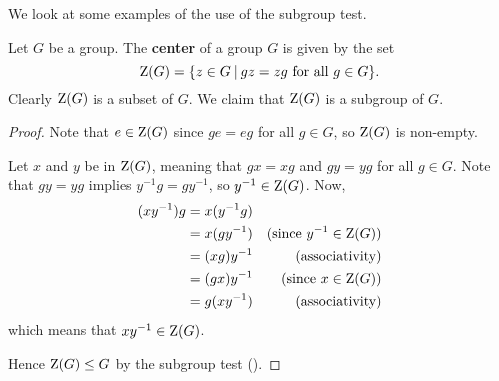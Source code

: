 We look at some examples of the use of the subgroup test.
\begin{example}\label{example-center-of-group}
    Let $G$ be a group. The \textbf{center} of a group $G$ is given by the set
    \[
        \CenterGrp{G} = \{z \in G \vert gz = zg \text{ for all } g \in G\}.
    \]
    Clearly $\mathrm{Z}(G)$ is a subset of $G$. We claim that $\mathrm{Z}(G)$ is a subgroup of $G$.

    \begin{proof}
	    Note that $e \in \mathrm{Z}(G)$ since $ge = eg$ for all $g \in G$, so $\mathrm{Z}(G)$ is non-empty.

	    Let $x$ and $y$ be in $\mathrm{Z}(G)$, meaning that $gx = xg$ and $gy = yg$ for all $g \in G$. Note that $gy = yg$ implies $y^{-1}g = gy^{-1}$, so $y^{-1} \in \mathrm{Z}(G)$. Now,
	    \begin{align*}
	        (xy^{-1})g &= x(y^{-1}g)\\
	        &= x(gy^{-1}) & (\text{since } y^{-1} \in \mathrm{Z}(G))\\
	        &= (xg)y^{-1} & (\text{associativity})\\
	        &= (gx)y^{-1} & (\text{since } x \in \mathrm{Z}(G))\\
	        &= g(xy^{-1}) & (\text{associativity})
	    \end{align*}
	    which means that $xy^{-1} \in \mathrm{Z}(G)$.
        
        Hence $\mathrm{Z}(G) \leq G$ by the subgroup test ().
    \end{proof}
\end{example}

